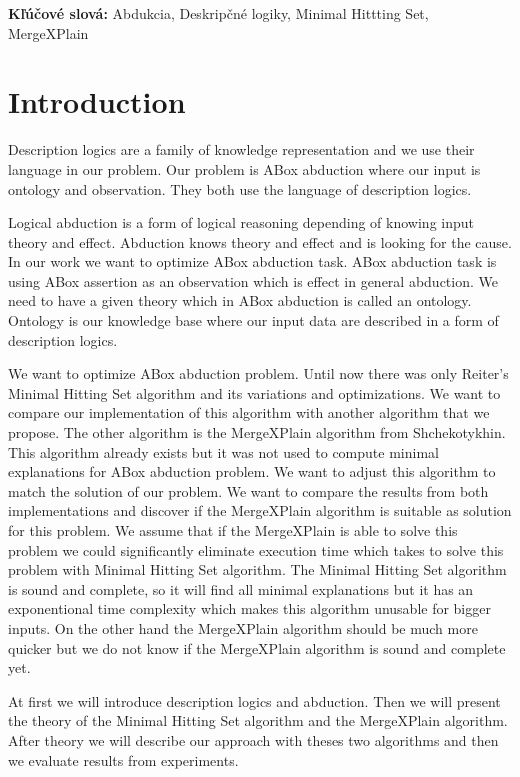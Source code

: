 \documentclass[12pt,a4paper]{article}
\begin{document}
\noindent \textbf{Kľúčové slová:}
Abdukcia, Deskripčné logiky, Minimal Hittting Set, MergeXPlain

\pagebreak
\thispagestyle{empty}
\tableofcontents
\thispagestyle{empty}

\pagebreak
\thispagestyle{empty}
\listoffigures

\pagebreak
\setcounter{page}{1}
\section{Introduction}
Description logics are a family of knowledge representation and we use their language in our problem. Our problem is ABox abduction where our input is ontology and observation. They both use the language of description logics.

Logical abduction is a form of logical reasoning depending of knowing input theory and effect. Abduction knows theory and effect and is looking for the cause. In our work we want to optimize ABox abduction task. ABox abduction task is using ABox assertion as an observation which is effect in general abduction. We need to have a given theory which in ABox abduction is called an ontology. Ontology is our knowledge base where our input data are described in a form of description logics.

We want to optimize ABox abduction problem. Until now there was only Reiter's Minimal Hitting Set algorithm and its variations and optimizations. We want to compare our implementation of this algorithm with another algorithm that we propose. The other algorithm is the MergeXPlain algorithm from Shchekotykhin. This algorithm already exists but it was not used to compute minimal explanations for ABox abduction problem. We want to adjust this algorithm to match the solution of our problem. We want to compare the results from both implementations and discover if the MergeXPlain algorithm is suitable as solution for this problem. We assume that if the MergeXPlain is able to solve this problem we could significantly eliminate execution time which takes to solve this problem with Minimal Hitting Set algorithm. The Minimal Hitting Set algorithm is sound and complete, so it will find all minimal explanations but it has an exponentional time complexity which makes this algorithm unusable for bigger inputs. On the other hand the MergeXPlain algorithm should be much more quicker but we do not know if the MergeXPlain algorithm is sound and complete yet. 

At first we will introduce description logics and abduction. Then we will present the theory of the Minimal Hitting Set algorithm and the MergeXPlain algorithm. After theory we will describe our approach with theses two algorithms and then we evaluate results from experiments.
\end{document}
